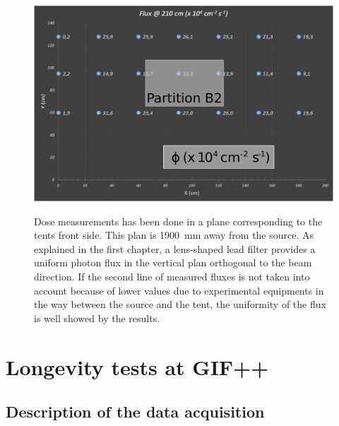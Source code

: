 			\begin{figure}[!h]
				\begin{center}
					\includegraphics[width = \plotwidth]{fig/GIF-fluxes.pdf}\\
					\caption{\label{fig:Dose} Dose measurements has been done in a plane corresponding to the tents front side. This plan is \SI{1900}{\mm} away from the source. As explained in the first chapter, a lens-shaped lead filter provides a uniform photon flux in the vertical plan orthogonal to the beam direction. If the second line of measured fluxes is not taken into account because of lower values due to experimental equipments in the way between the source and the tent, the uniformity of the flux is well showed by the results.}
				\end{center}
			\end{figure}

\newpage

\section{Longevity tests at GIF++}
\label{sec:GIFtests}

		\subsection{Description of the data acquisition}

